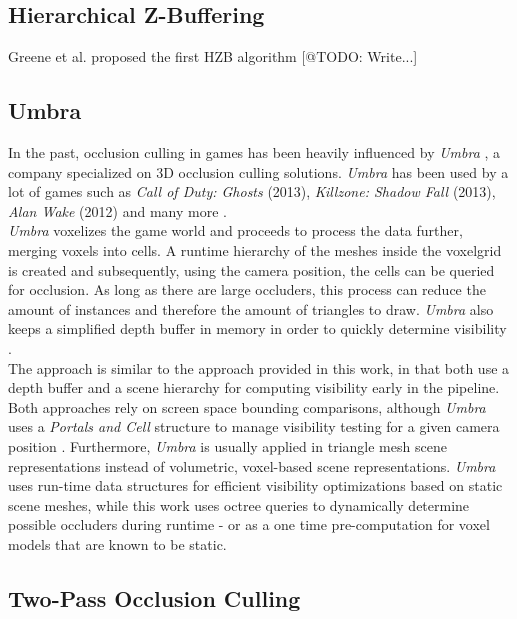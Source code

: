 \subsection*{Hierarchical Z-Buffering}
Greene et al. \cite{Greene93,Greene95} proposed the first \ac{HZB} algorithm [@TODO: Write...]


\subsection*{Umbra}

In the past, occlusion culling in games has been heavily influenced by \emph{Umbra} \cite{Umbra2024}, a company 
specialized on 3D occlusion culling solutions. \emph{Umbra} has been used by a lot of games such as 
\emph{Call of Duty: Ghosts} (2013), \emph{Killzone: Shadow Fall} (2013), \emph{Alan Wake} (2012) and many more 
\cite{UmbraWiki,CallOfDutyGhostsCredits,KillzoneUmbra,AlanWakeUmbra}. \\

\noindent
\emph{Umbra} voxelizes the game world and proceeds to process the data further, merging voxels into cells. 
A runtime hierarchy of the meshes inside the voxelgrid is created and subsequently, using the camera position, 
the cells can be queried for occlusion. As long as there are large occluders, this process can reduce the amount 
of instances and therefore the amount of triangles to draw. \emph{Umbra} also keeps a simplified depth buffer in 
memory in order to quickly determine visibility \cite{Medium2018}. \\

\noindent 
The approach is similar to the approach provided  in this work, in that both use a depth buffer and a scene hierarchy 
for computing visibility early in the pipeline. Both approaches rely on screen space bounding comparisons, although 
\emph{Umbra} uses a \emph{Portals and Cell} structure to manage visibility testing for a given camera position 
\cite{Medium2018}. Furthermore, \emph{Umbra} is usually applied in triangle mesh scene representations instead 
of volumetric, voxel-based scene representations. \emph{Umbra} uses run-time data structures for efficient visibility 
optimizations based on static scene meshes, while this work uses octree queries to dynamically determine possible 
occluders during runtime - or as a one time pre-computation for voxel models that are known to be static. \\


\subsection*{Two-Pass Occlusion Culling}

